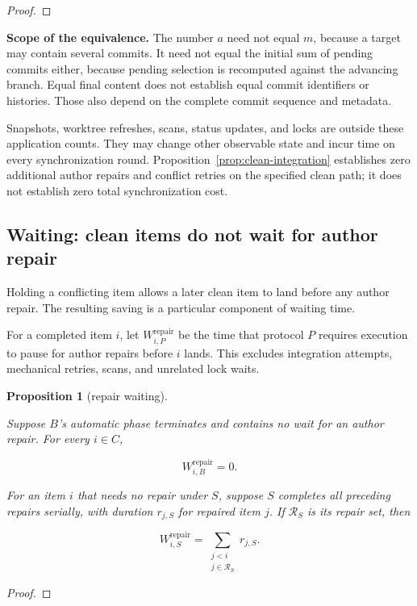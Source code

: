 \documentclass[pdflatex,sn-mathphys-ay]{sn-jnl}
\theoremstyle{thmstyleone}
\newtheorem{proposition}[theorem]{Proposition}
\theoremstyle{thmstylethree}
\begin{document}
\begin{appendices}
\begin{proof}
\end{proof}

\textbf{Scope of the equivalence.} The number \(a\) need not equal \(m\), because a target may contain several commits. It need not equal the initial sum of pending commits either, because pending selection is recomputed against the advancing branch. Equal final content does not establish equal commit identifiers or histories. Those also depend on the complete commit sequence and metadata.

Snapshots, worktree refreshes, scans, status updates, and locks are outside these application counts. They may change other observable state and incur time on every synchronization round. Proposition~\ref{prop:clean-integration} establishes zero additional author repairs and conflict retries on the specified clean path; it does not establish zero total synchronization cost.

\subsection{Waiting: clean items do not wait for author repair}\label{app:clean-items}

Holding a conflicting item allows a later clean item to land before any author repair. The resulting saving is a particular component of waiting time.

For a completed item \(i\), let \(W_{i,P}^{\mathrm{repair}}\) be the time that protocol \(P\) requires execution to pause for author repairs before \(i\) lands. This excludes integration attempts, mechanical retries, scans, and unrelated lock waits.

\begin{proposition}[repair waiting]\label{prop:repair-waiting}

Suppose \(B\)'s automatic phase terminates and contains no wait for an author repair. For every \(i\in C\),

\[
W_{i,B}^{\mathrm{repair}}=0.
\]

For an item \(i\) that needs no repair under \(S\), suppose \(S\) completes all preceding repairs serially, with duration \(r_{j,S}\) for repaired item \(j\). If \(\mathcal R_S\) is its repair set, then

\[
W_{i,S}^{\mathrm{repair}}
=\sum_{\substack{j<i\\j\in\mathcal R_S}}r_{j,S}.
\]

\end{proposition}
\begin{proof}


\end{proof}
\end{appendices}
\end{document}
